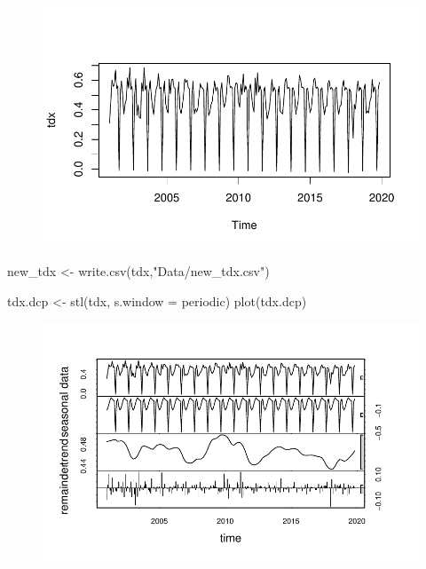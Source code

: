 \documentclass[
  letterpaper,
  DIV=11,
  numbers=noendperiod]{scrartcl}
\newenvironment{Shaded}{\begin{snugshade}}{\end{snugshade}}
\newcommand{\AttributeTok}[1]{\textcolor[rgb]{0.40,0.45,0.13}{#1}}
\newcommand{\FunctionTok}[1]{\textcolor[rgb]{0.28,0.35,0.67}{#1}}
\newcommand{\NormalTok}[1]{\textcolor[rgb]{0.00,0.23,0.31}{#1}}
\newcommand{\OtherTok}[1]{\textcolor[rgb]{0.00,0.23,0.31}{#1}}
\newcommand{\StringTok}[1]{\textcolor[rgb]{0.13,0.47,0.30}{#1}}
\begin{document}
\begin{figure}[H]

{\centering \includegraphics{Quarto_files/figure-pdf/unnamed-chunk-13-1.pdf}

}

\end{figure}

\begin{Shaded}
\begin{Highlighting}[]
\NormalTok{new\_tdx }\OtherTok{\textless{}{-}} \FunctionTok{write.csv}\NormalTok{(tdx,}\StringTok{"Data/new\_tdx.csv"}\NormalTok{)}
\end{Highlighting}
\end{Shaded}

\begin{Shaded}
\begin{Highlighting}[]
\NormalTok{tdx.dcp }\OtherTok{\textless{}{-}} \FunctionTok{stl}\NormalTok{(tdx, }\AttributeTok{s.window =} \StringTok{\textquotesingle{}periodic\textquotesingle{}}\NormalTok{)}
\FunctionTok{plot}\NormalTok{(tdx.dcp)}
\end{Highlighting}
\end{Shaded}

\begin{figure}[H]

{\centering \includegraphics{Quarto_files/figure-pdf/unnamed-chunk-14-1.pdf}

}

\end{figure}
\end{document}

